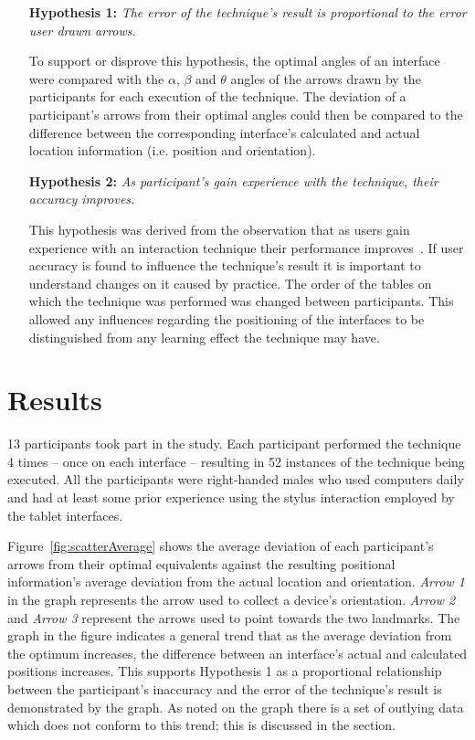 \documentclass{bmcart}
\begin{document}
\begin{itemize}
\item[\textbf{Hypothesis 1:}] {\emph{The error of the technique's result is proportional to the error user drawn arrows.}}

To support or disprove this hypothesis, the optimal angles of an interface were compared with the $\alpha$, $\beta$ and $\theta$ angles of the arrows drawn by the participants for each execution of the technique.
The deviation of a participant's arrows from their optimal angles could then be compared to the difference between the corresponding interface's calculated and actual location information (i.e. position and orientation).

\item[\textbf{Hypothesis 2:}] {\emph{As participant's gain experience with the technique, their accuracy improves.}}

This hypothesis was derived from the observation that as users gain experience with an interaction technique their performance improves~\cite{Ji2016}.
If user accuracy is found to influence the technique's result it is important to understand changes on it caused by practice.
The order of the tables on which the technique was performed was changed between participants.
This allowed any influences regarding the positioning of the interfaces to be distinguished from any learning effect the technique may have.
\end{itemize}


\section*{Results}\label{sec:results}  

13 participants took part in the study.
Each participant performed the technique 4 times -- once on each interface -- resulting in 52 instances of the technique being executed.
All the participants were right-handed males who used computers daily and had at least some prior experience using the stylus interaction employed by the tablet interfaces.


Figure~\ref{fig:scatterAverage} shows the average deviation of each participant's arrows from their optimal equivalents against the resulting positional information's average deviation from the actual location and orientation.
{\emph{Arrow 1}} in the graph represents the arrow used to collect a device's orientation.
{\emph{Arrow 2}} and {\emph{Arrow 3}} represent the arrows used to point towards the two landmarks.
The graph in the figure indicates a general trend that as the average deviation from the optimum increases, the difference between an interface's actual and calculated positions increases.
This supports Hypothesis 1 as a proportional relationship between the participant's inaccuracy and the error of the technique's result is demonstrated by the graph.
As noted on the graph there is a set of outlying data which does not conform to this trend; this is discussed in the  section.
\end{document}

